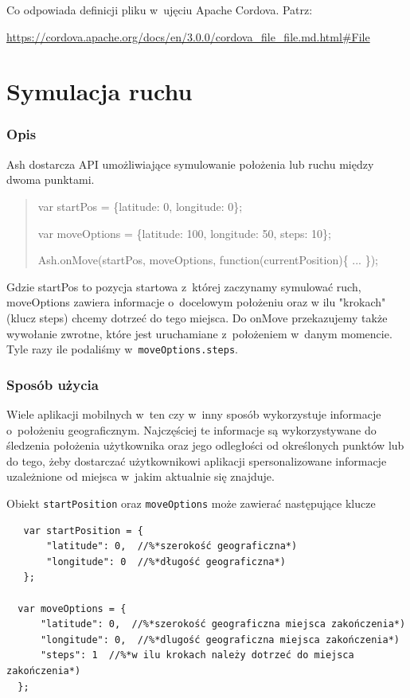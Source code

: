 \documentclass[brudnopis]{xmgr}
\begin{document}
Co odpowiada definicji pliku w~ujęciu Apache Cordova. Patrz:

\url{https://cordova.apache.org/docs/en/3.0.0/cordova_file_file.md.html#File}

\section{Symulacja ruchu}

\subsubsection{Opis}
Ash dostarcza API umożliwiające symulowanie położenia lub ruchu między dwoma punktami.

\begin{quote}
var startPos = \{latitude: 0, longitude: 0\};

var moveOptions = \{latitude: 100, longitude: 50, steps: 10\};

Ash.onMove(startPos, moveOptions, function(currentPosition)\{ ... \});
\end{quote}

Gdzie startPos to pozycja startowa z~której zaczynamy symulować ruch, moveOptions zawiera informacje o~docelowym położeniu oraz w ilu "krokach" (klucz steps) chcemy dotrzeć do tego miejsca. Do onMove przekazujemy także wywołanie zwrotne, które jest uruchamiane z~położeniem w~danym momencie. Tyle razy ile podaliśmy w~\texttt{moveOptions.steps}. 

\subsubsection{Sposób użycia}

Wiele aplikacji mobilnych w~ten czy w~inny sposób wykorzystuje informacje o~położeniu geograficznym. Najczęściej te informacje są wykorzystywane do śledzenia położenia użytkownika oraz jego odległości od określonych punktów lub do tego, żeby dostarczać użytkownikowi aplikacji spersonalizowane informacje uzależnione od miejsca w~jakim aktualnie się znajduje. 

Obiekt \texttt{startPosition} oraz \texttt{moveOptions} może zawierać następujące klucze

\begin{lstlisting}
   var startPosition = {
       "latitude": 0,  //%*szerokość geograficzna*)
       "longitude": 0  //%*długość geograficzna*)
   };
 
  var moveOptions = {
      "latitude": 0,  //%*szerokość geograficzna miejsca zakończenia*)
      "longitude": 0,  //%*dlugość geograficzna miejsca zakończenia*)
      "steps": 1  //%*w ilu krokach należy dotrzeć do miejsca zakończenia*)
  };
\end{lstlisting}
\end{document}
